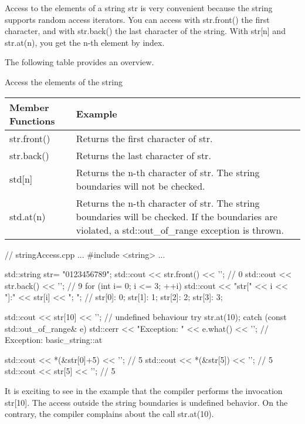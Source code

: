 Access to the elements of a string str is very convenient because the string supports random access iterators. You can access with str.front() the first character, and with str.back() the last character of the string. With str[n] and str.at(n), you get the n-th element by index.

The following table provides an overview.

\begin{center}
Access the elements of the string
\end{center}

\begin{longtable}[c]{|l|l|}
\hline
\textbf{Member Functions} & \textbf{Example}                                                              \\ \hline
\endfirsthead
%
\endhead
%
str.front()               & Returns the first character of str.                                           \\ \hline
str.back()                & Returns the last character of str.                                            \\ \hline
std{[}n{]}                & Returns the n-th character of str. The string boundaries will not be checked. \\ \hline
std.at(n) & Returns the n-th character of str. The string boundaries will be checked. If the boundaries are violated, a std::out\_of\_range exception is thrown. \\ \hline
\end{longtable}


\begin{cpp}
// stringAccess.cpp
...
#include <string>
...

std::string str= {"0123456789"};
std::cout << str.front() << '\n'; // 0
std::cout << str.back() << '\n'; // 9
for (int i= 0; i <= 3; ++i){
	std::cout << "str[" << i << "]:" << str[i] << "; ";
} // str[0]: 0; str[1]: 1; str[2]: 2; str[3]: 3;

std::cout << str[10] << '\n'; // undefined behaviour
try{
	str.at(10);
}
catch (const std::out_of_range& e){
	std::cerr << "Exception: " << e.what() << '\n';
} // Exception: basic_string::at

std::cout << *(&str[0]+5) << '\n'; // 5
std::cout << *(&str[5]) << '\n'; // 5
std::cout << str[5] << '\n'; // 5
\end{cpp}

It is exciting to see in the example that the compiler performs the invocation str[10]. The access outside the string boundaries is undefined behavior. On the contrary, the compiler complains about the call str.at(10).





























